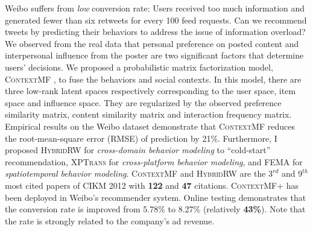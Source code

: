 \documentclass[10.5pt]{article}
\begin{document}
Weibo suffers from \textit{low} conversion rate: Users received too much information and generated fewer than six retweets for every 100 feed requests. Can we recommend tweets by predicting their behaviors to address the issue of information overload?
We observed from the real data that personal preference on posted content and interpersonal influence from the poster are two significant factors that determine users' decisions. We proposed a probabilistic matrix factorization model, \textsc{ContextMF} \cite{jiang2012socialcontextual}, to fuse the behaviors and social contexts. In this model, there are three low-rank latent spaces respectively corresponding to the user space, item space and influence space. They are regularized by the observed preference similarity matrix, content similarity matrix and interaction frequency matrix.
Empirical results on the Weibo dataset demonstrate that \textsc{ContextMF} reduces the root-mean-square error (RMSE) of prediction by 21\%.
Furthermore, I proposed \textsc{HybridRW} \cite{jiang2012socialrecommendation} for {\em cross-domain behavior modeling} to ``cold-start'' recommendation, \textsc{XPTrans} \cite{jiang2016little} for {\em cross-platform behavior modeling}, and \textsc{FEMA} \cite{jiang2014fema} for {\em spatiotemporal behavior modeling}.
\textsc{ContextMF} \cite{jiang2012socialcontextual} and \textsc{HybridRW} \cite{jiang2012socialrecommendation} are the $3^{rd}$ and $9^{th}$ most cited papers of CIKM 2012 with \textbf{122} and \textbf{47} citations.
\textsc{ContextMF+} \cite{jiang2014scalable} has been deployed in Weibo's recommender system. Online testing demonstrates that the conversion rate is improved from 5.78\% to 8.27\% (relatively \textbf{43\%}). Note that the rate is strongly related to the company's ad revenue.

\end{document}
